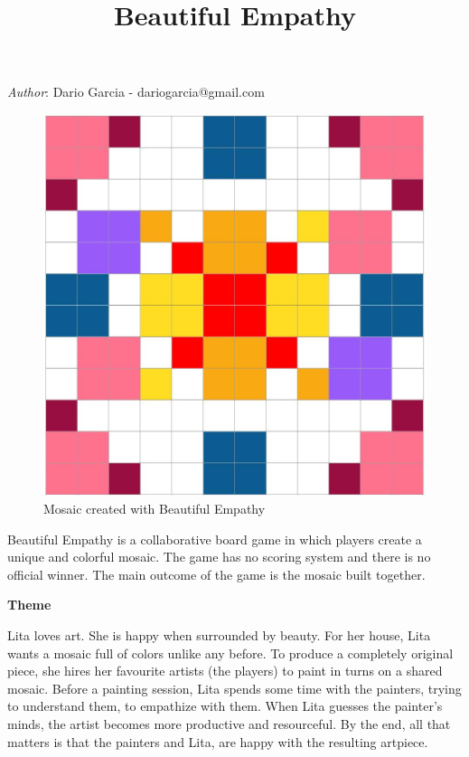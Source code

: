 \documentclass[twocolumn]{article}
\title{Beautiful Empathy}
\newcommand{\lvl}[1]{\vspace{0.5cm}\Large{\textbf{#1}}\vspace{0.2cm}}
\begin{document}
\maketitle

\textit{Author}: Dario Garcia - dariogarcia@gmail.com

\begin{figure}[h!]
\centering
\includegraphics[scale=0.15]{First_ever.jpg}
\caption{Mosaic created with Beautiful Empathy}
\label{fig:mosaic}
\end{figure}

\lvl{}
\vspace{-1cm}

Beautiful Empathy is a collaborative board game in which players create a unique and colorful mosaic. The game has no scoring system and there is no official winner. The main outcome of the game is the mosaic built together. 

\lvl{Theme}

Lita loves art. She is happy when surrounded by beauty. For her house, Lita wants a mosaic full of colors unlike any before. To produce a completely original piece, she hires her favourite artists (the players) to paint in turns on a shared mosaic. Before a painting session, Lita spends some time with the painters, trying to understand them, to empathize with them. When Lita guesses the painter's minds, the artist becomes more productive and resourceful. By the end, all that matters is that the painters and Lita, are happy with the resulting artpiece.
\end{document}
